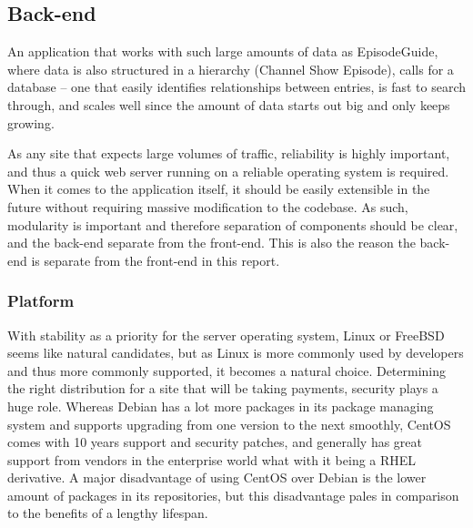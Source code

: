 \subsection{Back-end}
An application that works with such large amounts of data as EpisodeGuide, where data is also structured in a hierarchy (Channel \guillemotright Show \guillemotright Episode), calls for a database -- one that easily identifies relationships between entries, is fast to search through, and scales well since the amount of data starts out big and only keeps growing. 

As any site that expects large volumes of traffic, reliability is highly important, and thus a quick web server running on a reliable operating system is required. When it comes to the application itself, it should be easily extensible in the future without requiring massive modification to the codebase. As such, modularity is important and therefore separation of components should be clear, and the back-end separate from the front-end. This is also the reason the back-end is separate from the front-end in this report.  



\subsubsection{Platform}
With stability as a priority for the server operating system, Linux or FreeBSD seems like natural candidates, but as Linux is more commonly used by developers and thus more commonly supported, it becomes a natural choice. Determining the right distribution for a site that will be taking payments, security plays a huge role. Whereas Debian has a lot more packages in its package managing system and supports upgrading from one version to the next smoothly, CentOS comes with 10 years support and security patches, and generally has great support from vendors in the enterprise world what with it being a RHEL derivative. A major disadvantage of using CentOS over Debian is the lower amount of packages in its repositories, but this disadvantage pales in comparison to the benefits of a lengthy lifespan.
 

